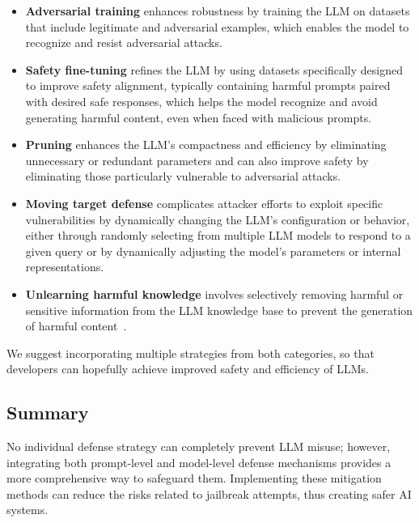 \begin{itemize}
    \item \textbf{Adversarial training} enhances robustness by training the LLM on datasets that include legitimate and adversarial examples, which enables the model to recognize and resist adversarial attacks.
    \item \textbf{Safety fine-tuning} refines the LLM by using datasets specifically designed to improve safety alignment, typically containing harmful prompts paired with desired safe responses, which helps the model recognize and avoid generating harmful content, even when faced with malicious prompts.
    \item \textbf{Pruning} enhances the LLM's compactness and efficiency by eliminating unnecessary or redundant parameters and can also improve safety by eliminating those particularly vulnerable to adversarial attacks.
    \item \textbf{Moving target defense} complicates attacker efforts to exploit specific vulnerabilities by dynamically changing the LLM's configuration or behavior, either through randomly selecting from multiple LLM models to respond to a given query or by dynamically adjusting the model's parameters or internal representations.
    \item \textbf{Unlearning harmful knowledge} involves selectively removing harmful or sensitive information from the LLM knowledge base to prevent the generation of harmful content~\cite{lu2024eraserjailbreakingdefenselarge}.
\end{itemize}


We suggest incorporating multiple strategies from both categories, so that developers can hopefully achieve improved safety and efficiency of LLMs.

\subsection*{Summary}

No individual defense strategy can completely prevent LLM misuse; however, integrating both prompt-level and model-level defense mechanisms provides a more comprehensive way to safeguard them. Implementing these mitigation methods can reduce the risks related to jailbreak attempts, thus creating safer AI systems.
